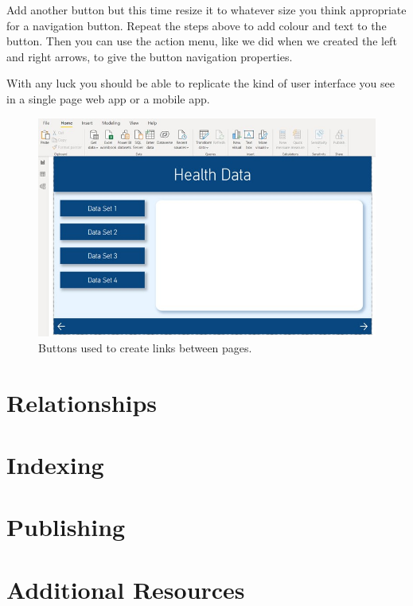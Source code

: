 \documentclass[
]{book}
\begin{document}
Add another button but this time resize it to whatever size you think appropriate for a navigation button. Repeat the steps above to add colour and text to the button. Then you can use the action menu, like we did when we created the left and right arrows, to give the button navigation properties.

With any luck you should be able to replicate the kind of user interface you see in a single page web app or a mobile app.

\begin{figure}
\centering
\includegraphics{bi13.jpg}
\caption{Buttons used to create links between pages.}
\end{figure}

\hypertarget{relationships}{%
\section{Relationships}\label{relationships}}

\hypertarget{indexing}{%
\section{Indexing}\label{indexing}}

\hypertarget{publishing}{%
\section{Publishing}\label{publishing}}

\hypertarget{additional-resources}{%
\section{Additional Resources}\label{additional-resources}}
\end{document}
